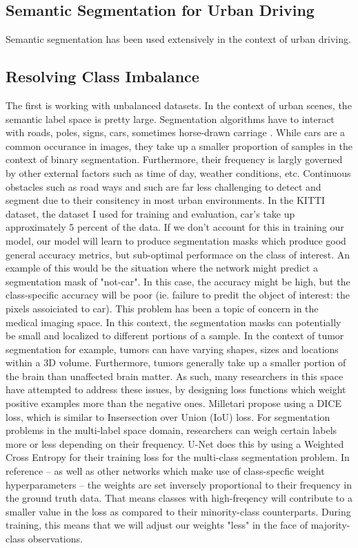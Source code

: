 \documentclass[Location Location Location! : Exploring Image Segmentation Problem In Urban Driving Scenarios]{IEEEtran}
\begin{document}
\subsection{Semantic Segmentation for Urban Driving}

Semantic segmentation has been used extensively in the context of urban driving.
	

\subsection{Resolving Class Imbalance}
The first is working with unbalanced datasets. In the context of urban scenes, the semantic label space is pretty large. Segmentation algorithms have to interact with roads, poles, signs, cars, sometimes horse-drawn carriage \cite{b2}. While cars are a common occurance in images, they take up a smaller proportion of samples in the context of binary segmentation. Furthermore, their frequency is largly governed by other external factors such as time of day, weather conditions, etc. Continuous obstacles such as road ways and such are far less challenging to detect and segment due to their consitency in most urban environments. In the KITTI dataset, the dataset I used for training and evaluation, car's take up approximately 5 percent of the data. If we don't account for this in training our model, our model will learn to produce segmentation masks which produce good general accuracy metrics, but sub-optimal performace on the class of interest. An example of this would be the situation where the network might predict a segmentation mask of "not-car". In this case, the accuracy might be high, but the class-specific accuracy will be poor (ie. failure to predit the object of interest: the pixels assoiciated to car). This problem has been a topic of concern in the medical imaging space. In this context, the segmentation masks can potentially be small and localized to different portions of a sample. In the context of tumor segmentation for example, tumors can have varying shapes, sizes and locations within a 3D volume. Furthermore, tumors generally take up a smaller portion of the brain than unaffected brain matter. As such, many researchers in this space have attempted to address these issues, by designing loss functions which weight positive examples more than the negative ones. Milletari \cite{b1} propose using a DICE loss, which is similar to Insersection over Union (IoU) loss. For segmentation problems in the multi-label space domain, researchers can weigh certain labels more or less depending on their frequency. U-Net \cite{unet} does this by using a Weighted Cross Entropy for their training loss for the multi-class segmentation problem. In reference \cite{unet} -- as well as other networks which make use of class-specfic weight hyperparameters  -- the weights are set inversely proportional to their frequency in the ground truth data. That means classes with high-freqency will contribute to a smaller value in the loss as compared to their minority-class counterparts. During training, this means that we will adjust our weights "less" in the face of majority-class observations. 
\end{document}
